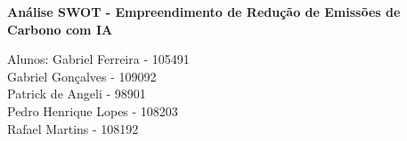 \documentclass[12pt,a4paper]{article}
\begin{document}
\begin{center}  
    \textbf{Análise SWOT - Empreendimento de Redução de Emissões de Carbono com IA}
    
    Alunos: Gabriel Ferreira - 105491 \\
    Gabriel Gonçalves - 109092  \\
    Patrick de Angeli - 98901  \\
    Pedro Henrique Lopes - 108203 \\
    Rafael Martins - 108192   
\end{center}
\date{\today}

\end{document}
